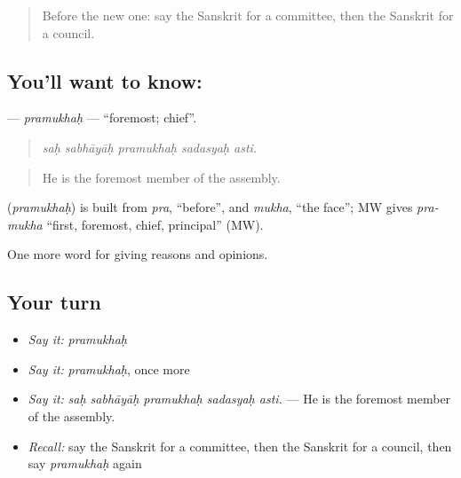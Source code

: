 \begin{quote}
Before the new one: say the Sanskrit for a committee, then the Sanskrit for a council.
\end{quote}

\subsection*{You'll want to know: }
\textbf{} — \emph{pramukhaḥ} — \textquotedblleft{}foremost; chief\textquotedblright{}.

\begin{quote}
    
\end{quote}

\begin{quote}
\emph{saḥ sabhāyāḥ pramukhaḥ sadasyaḥ asti.}
\end{quote}

\begin{quote}
He is the foremost member of the assembly.
\end{quote}

\begin{cousinweb}
\textbf{} (\emph{pramukhaḥ}) is built from \emph{pra}, \textquotedblleft{}before\textquotedblright{}, and \emph{mukha}, \textquotedblleft{}the face\textquotedblright{}; MW gives \emph{pra-mukha} \textquotedblleft{}first, foremost, chief, principal\textquotedblright{} (MW).
\end{cousinweb}

\begin{grammarlens}[title={What you've built}]
One more word for giving reasons and opinions.
\end{grammarlens}

\subsection*{Your turn}
\begin{itemize}
\raggedright
  \item \emph{Say it:} \emph{pramukhaḥ}
  \item \emph{Say it:} \emph{pramukhaḥ}, once more
  \item \emph{Say it:} \emph{saḥ sabhāyāḥ pramukhaḥ sadasyaḥ asti.} — He is the foremost member of the assembly.
  \item \emph{Recall:} say the Sanskrit for a committee, then the Sanskrit for a council, then say \emph{pramukhaḥ} again
\end{itemize}

